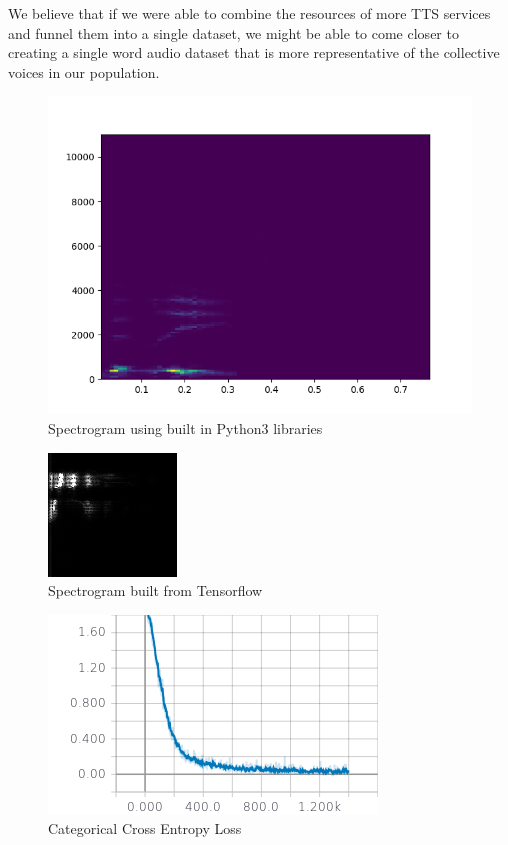 \documentclass[12pt,journal,compsoc]{IEEEtran}
\begin{document}
We believe that if we were able to combine the resources of more TTS services and funnel them into a single dataset, we might be able to come closer to creating a single word audio dataset that is more representative of the collective voices in our population. 

\begin{figure}[h]
\caption{Spectrogram using built in Python3 libraries}
\vspace{5mm}
\includegraphics[scale=.4]{delete}
\end{figure}

\begin{figure}[h]
\caption{Spectrogram built from Tensorflow}
\vspace{5mm}
\includegraphics[scale=1.4]{spectrogram}
\end{figure}

\begin{figure}[h]
\caption{Categorical Cross Entropy Loss}
\vspace{5mm}
\includegraphics[scale=.7]{first}
\end{figure}
\end{document}

